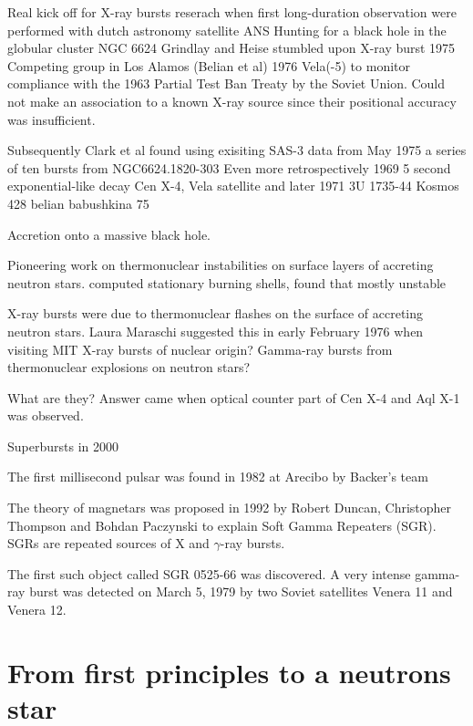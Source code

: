 
Real kick off for X-ray bursts reserach when first long-duration observation were performed with dutch astronomy satellite ANS
Hunting for a black hole in the globular cluster NGC 6624 Grindlay and Heise stumbled upon X-ray burst 1975 \cite{GH75} \cite{GGS76}
Competing group in Los Alamos (Belian et al) 1976\cite{BCE76}
Vela(-5) to monitor compliance with the 1963 Partial Test Ban Treaty by the Soviet Union. Could not make an association to a known X-ray source since their positional accuracy was insufficient.


Subsequently Clark et al found using exisiting SAS-3 data from May 1975 a series of ten bursts from NGC6624.1820-303 \cite{CJB76}
Even more retrospectively
1969 \cite{BCE72} 5 second exponential-like decay Cen X-4, Vela satellite  and later 1971 \cite{BKM75} 3U 1735-44 Kosmos 428  
belian \cite{BCE72}
babushkina 75\cite{BKM75}

Accretion onto a massive black hole.


Pioneering work on thermonuclear instabilities on surface layers of accreting neutron stars. \cite{HvH75}
computed stationary burning shells, found that mostly unstable

X-ray bursts were due to thermonuclear flashes on the surface of accreting neutron stars.
Laura Maraschi suggested this in early February 1976 when visiting MIT 
X-ray bursts of nuclear origin? \cite{MC77}
Gamma-ray bursts from thermonuclear explosions on neutron stars? \cite{WT76}



What are they? Answer came when optical counter part of Cen X-4 \cite{vPV80} and Aql X-1 \cite{TCB78} was observed.

Superbursts in 2000\cite{CHK00}

The first millisecond pulsar was found in 1982 at Arecibo by Backer’s team

The theory of magnetars was proposed in 1992 by Robert Duncan, Christopher Thompson and Bohdan Paczynski to explain Soft Gamma Repeaters (SGR). SGRs are repeated sources of X and $\gamma$-ray bursts. \cite{DT92}

The first such object called SGR 0525-66 was discovered.
A very intense gamma-ray burst was detected on March 5, 1979 by two Soviet satellites Venera 11 and Venera 12.\cite{MGI79}



\section{From first principles to a neutrons star}

